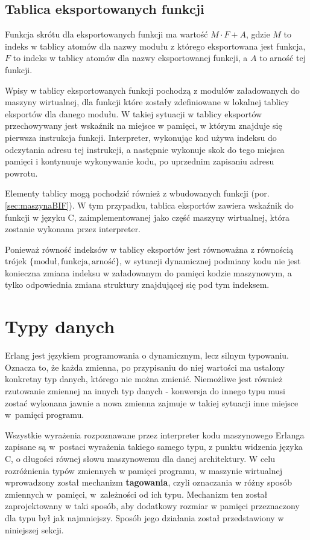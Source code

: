 \subsection{Tablica eksportowanych funkcji}
\label{sub:maszynaTablicaEksportow}

Funkcja skrótu dla eksportowanych funkcji ma wartość $M \cdot F+A$, gdzie $M$ to indeks w tablicy atomów dla nazwy modułu z którego eksportowana jest funkcja, $F$ to indeks w tablicy atomów dla nazwy eksportowanej funkcji, a $A$ to arność tej funkcji.

Wpisy w tablicy eksportowanych funkcji pochodzą z modułów załadowanych do maszyny wirtualnej, dla funkcji które zostały zdefiniowane w lokalnej tablicy eksportów dla danego modułu. W takiej sytuacji w tablicy eksportów przechowywany jest wskaźnik na miejsce w pamięci, w którym znajduje się pierwsza instrukcja funkcji. Interpreter, wykonując kod używa indeksu do odczytania adresu tej instrukcji, a następnie wykonuje skok do tego miejsca pamięci i kontynuuje wykonywanie kodu, po uprzednim zapisaniu adresu powrotu.

Elementy tablicy mogą pochodzić również z wbudowanych funkcji (por. \ref{sec:maszynaBIF}). W tym przypadku, tablica eksportów zawiera wskaźnik do funkcji w języku C, zaimplementowanej jako część maszyny wirtualnej, która zostanie wykonana przez interpreter.

Ponieważ równość indeksów w tablicy eksportów jest równoważna z równością trójek $\lbrace\text{moduł},\text{funkcja},\text{arność}\rbrace$, w sytuacji dynamicznej podmiany kodu nie jest konieczna zmiana indeksu w załadowanym do pamięci kodzie maszynowym, a tylko odpowiednia zmiana struktury znajdującej się pod tym indeksem.

\section{Typy danych}
\label{sec:maszynaTypy}

Erlang jest językiem programowania o dynamicznym, lecz silnym typowaniu. Oznacza to, że każda zmienna, po przypisaniu do niej wartości ma ustalony konkretny typ danych, którego nie można zmienić. Niemożliwe jest również rzutowanie zmiennej na innych typ danych - konwersja do innego typu musi zostać wykonana jawnie a nowa zmienna zajmuje w takiej sytuacji inne miejsce w~pamięci programu.

Wszystkie wyrażenia rozpoznawane przez interpreter kodu maszynowego Erlanga zapisane są w~postaci wyrażenia takiego samego typu, z punktu widzenia języka C, o długości równej słowu maszynowemu dla danej architektury.
W celu rozróżnienia typów zmiennych w pamięci programu, w maszynie wirtualnej wprowadzony został mechanizm \textbf{tagowania}, czyli oznaczania w różny sposób zmiennych w~pamięci, w~zależności od ich typu. Mechanizm ten został zaprojektowany w taki sposób, aby dodatkowy rozmiar w pamięci przeznaczony dla typu był jak najmniejszy. Sposób jego działania został przedstawiony w niniejszej sekcji.

